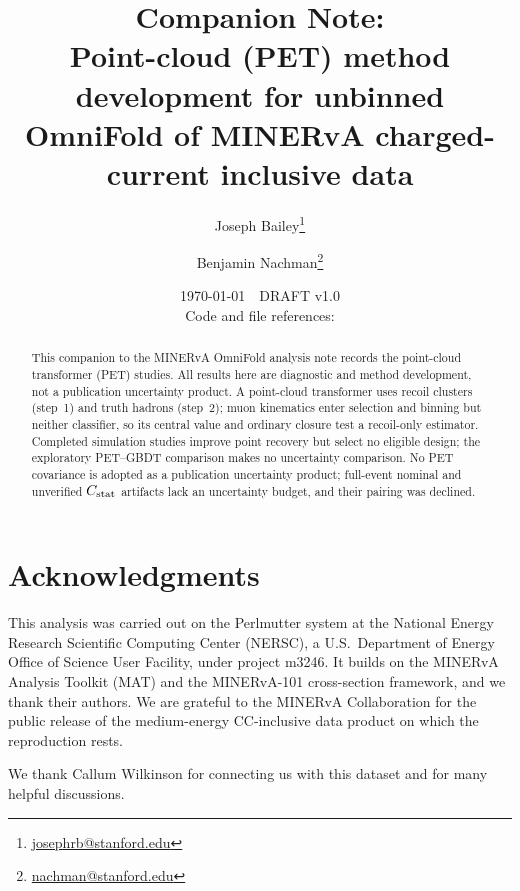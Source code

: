 \documentclass[11pt]{article}
\title{\textbf{Companion Note:}\\
Point-cloud (PET) method development for unbinned OmniFold of MINERvA charged-current inclusive data}
\author[1]{Joseph Bailey\thanks{\url{josephrb@stanford.edu}}} \author[2]{Benjamin Nachman\thanks{\url{nachman@stanford.edu}}} \affil[1]{Department of Physics, Stanford University} \affil[2]{Department of Particle Physics and Astrophysics, Stanford University and SLAC National Laboratory}
\date{\today~~DRAFT v1.0\\[4pt]\small Code and file references: \repolink}
\begin{document}
\maketitle

\begin{abstract}
This companion to the MINERvA OmniFold analysis note records the point-cloud
transformer (PET) studies. All results here are diagnostic and method
development, not a publication uncertainty product.
A point-cloud transformer uses recoil clusters (step~1) and truth hadrons
(step~2); muon kinematics enter selection and binning but neither classifier, so
its central value and ordinary closure test a recoil-only estimator.
Completed simulation studies improve point recovery but select no eligible
design; the exploratory PET--GBDT comparison makes no uncertainty comparison.
No PET covariance is adopted as a publication uncertainty product; full-event
nominal and unverified $C_{\rm stat}$ artifacts lack an uncertainty budget, and
their pairing was declined.
\end{abstract}

\setcounter{tocdepth}{2}
\tableofcontents



\section*{Acknowledgments}
This
analysis was carried out on the Perlmutter system at the National Energy
Research Scientific Computing Center (NERSC), a U.S.\ Department of Energy
Office of Science User Facility, under project m3246. It builds on the MINERvA
Analysis Toolkit (MAT) and the MINERvA-101 cross-section framework, and we thank
their authors. We are grateful to the MINERvA Collaboration for the public release
of the medium-energy CC-inclusive data product on which the reproduction rests.

We thank Callum Wilkinson for connecting us with this dataset and for many helpful discussions.
\end{document}
